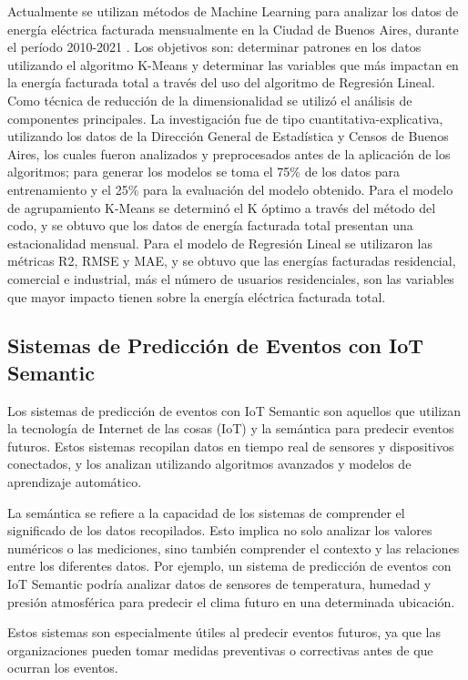\documentclass[12pt]{article}
\begin{document}
Actualmente se utilizan métodos de Machine Learning para analizar los datos de energía eléctrica facturada mensualmente en la Ciudad de Buenos Aires, durante el período 2010-2021 \citep{ref52}. Los objetivos son: determinar patrones en los datos utilizando el algoritmo K-Means y determinar las variables que más impactan en la energía facturada total a través del uso del algoritmo de Regresión Lineal. Como técnica de reducción de la dimensionalidad se utilizó el análisis de componentes principales. La investigación fue de tipo cuantitativa-explicativa, utilizando los datos de la Dirección General de Estadística y Censos de Buenos Aires, los cuales fueron analizados y preprocesados antes de la aplicación de los algoritmos; para generar los modelos se toma el 75\% de los datos para entrenamiento y el 25\% para la evaluación del modelo obtenido. Para el modelo de agrupamiento K-Means se determinó el K óptimo a través del método del codo, y se obtuvo que los datos de energía facturada total presentan una estacionalidad mensual. Para el modelo de Regresión Lineal se utilizaron las métricas R2, RMSE y MAE, y se obtuvo que las energías facturadas residencial, comercial e industrial, más el número de usuarios residenciales, son las variables que mayor impacto tienen sobre la energía eléctrica facturada total.

\subsection{Sistemas de Predicción de Eventos con IoT Semantic}

Los sistemas de predicción de eventos con IoT Semantic son aquellos que utilizan la tecnología de Internet de las cosas (IoT) y la semántica para predecir eventos futuros. Estos sistemas recopilan datos en tiempo real de sensores y dispositivos conectados, y los analizan utilizando algoritmos avanzados y modelos de aprendizaje automático.

La semántica se refiere a la capacidad de los sistemas de comprender el significado de los datos recopilados. Esto implica no solo analizar los valores numéricos o las mediciones, sino también comprender el contexto y las relaciones entre los diferentes datos. Por ejemplo, un sistema de predicción de eventos con IoT Semantic podría analizar datos de sensores de temperatura, humedad y presión atmosférica para predecir el clima futuro en una determinada ubicación.

Estos sistemas son especialmente útiles al predecir eventos futuros, ya que las organizaciones pueden tomar medidas preventivas o correctivas antes de que ocurran los eventos.
\end{document}
